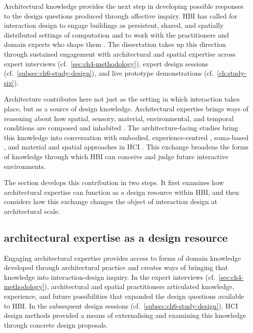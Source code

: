 Architectural knowledge provides the next step in developing possible
responses to the design questions produced through affective inquiry. HBI has called for interaction design to engage buildings as persistent, shared, and spatially distributed settings of computation \cite{alavi2018artifacts, alavi2019introduction, wiberg2020interaction} and to work with the practitioners and domain experts who shape them \cite{kirsh2019architects}. The dissertation takes up this direction through sustained engagement with architectural and spatial expertise across expert interviews (cf.~\autoref{sec:ch4-methodology}), expert design sessions (cf.~\autoref{subsec:ch6-study-design}), and live prototype demonstrations (cf.~\autoref{ch:study-six}).

Architecture contributes here not just as the setting in which interaction takes place, but as a source of design knowledge. Architectural expertise brings ways of reasoning about how spatial, sensory, material, environmental, and temporal conditions are composed and inhabited \cite{pallasmaa2024eyes, griffero2016atmospheres, zumthor2006atmospheres, verma2022appraisal}. The architecture-facing studies bring this knowledge into conversation with embodied, experience-centred \cite{hook2018designing}, soma-based \cite{tschaepe2021somaesthetics}, and material and spatial approaches in HCI \cite{van2018skin,nabil2017interioractive}. This exchange broadens the forms of knowledge through which HBI can conceive and judge future interactive environments. 

The section develops this contribution in two steps. It first examines how architectural expertise can function as a design resource within HBI, and then considers how this exchange changes the object of interaction design at architectural scale.


\subsection{architectural expertise as a design resource}
\label{subsec:architectural-expertise}

Engaging architectural expertise provides access to forms of domain knowledge developed through architectural practice and creates ways of bringing that knowledge into interaction-design inquiry. In the expert interviews (cf.~\autoref{sec:ch4-methodology}), architectural and spatial practitioners articulated knowledge, experience, and future possibilities that expanded the design questions available to HBI. In the subsequent design sessions (cf.~\autoref{subsec:ch6-study-design}), HCI design methods provided a means of externalising and examining this knowledge through concrete design proposals.

